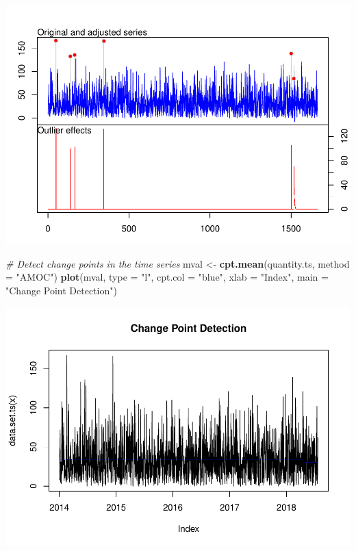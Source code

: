\documentclass[
]{book}
\newenvironment{Shaded}{\begin{snugshade}}{\end{snugshade}}
\newcommand{\AttributeTok}[1]{\textcolor[rgb]{0.13,0.29,0.53}{#1}}
\newcommand{\CommentTok}[1]{\textcolor[rgb]{0.56,0.35,0.01}{\textit{#1}}}
\newcommand{\FunctionTok}[1]{\textcolor[rgb]{0.13,0.29,0.53}{\textbf{#1}}}
\newcommand{\NormalTok}[1]{#1}
\newcommand{\OtherTok}[1]{\textcolor[rgb]{0.56,0.35,0.01}{#1}}
\newcommand{\StringTok}[1]{\textcolor[rgb]{0.31,0.60,0.02}{#1}}
\begin{document}
\includegraphics{_main_files/figure-latex/unnamed-chunk-39-2.pdf}

\begin{Shaded}
\begin{Highlighting}[]
\CommentTok{\# Detect change points in the time series}
\NormalTok{mval }\OtherTok{\textless{}{-}} \FunctionTok{cpt.mean}\NormalTok{(quantity.ts, }\AttributeTok{method =} \StringTok{"AMOC"}\NormalTok{)}
\FunctionTok{plot}\NormalTok{(mval, }\AttributeTok{type =} \StringTok{"l"}\NormalTok{, }\AttributeTok{cpt.col =} \StringTok{"blue"}\NormalTok{, }\AttributeTok{xlab =} \StringTok{"Index"}\NormalTok{, }\AttributeTok{main =} \StringTok{"Change Point Detection"}\NormalTok{)}
\end{Highlighting}
\end{Shaded}

\includegraphics{_main_files/figure-latex/unnamed-chunk-39-3.pdf}
\end{document}
